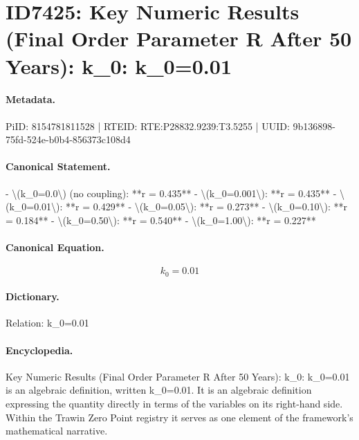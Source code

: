 \section*{ID7425: Key Numeric Results (Final Order Parameter R After 50 Years): k\_0: k\_0=0.01}
\paragraph{Metadata.}
PiID: 8154781811528 | RTEID: RTE:P28832.9239:T3.5255 | UUID: 9b136898-75fd-524e-b0b4-856373c108d4

\paragraph{Canonical Statement.}
- \textbackslash{}(k\_0=0.0\textbackslash{}) (no coupling): **r = 0.435** - \textbackslash{}(k\_0=0.001\textbackslash{}): **r = 0.435** - \textbackslash{}(k\_0=0.01\textbackslash{}): **r = 0.429** - \textbackslash{}(k\_0=0.05\textbackslash{}): **r = 0.273** - \textbackslash{}(k\_0=0.10\textbackslash{}): **r = 0.184** - \textbackslash{}(k\_0=0.50\textbackslash{}): **r = 0.540** - \textbackslash{}(k\_0=1.00\textbackslash{}): **r = 0.227**

\paragraph{Canonical Equation.}
\[
k_0=0.01
\]

\paragraph{Dictionary.}
Relation: k\_0=0.01

\paragraph{Encyclopedia.}
Key Numeric Results (Final Order Parameter R After 50 Years): k\_0: k\_0=0.01 is an algebraic definition, written k\_0=0.01. It is an algebraic definition expressing the quantity directly in terms of the variables on its right-hand side. Within the Trawin Zero Point registry it serves as one element of the framework's mathematical narrative.
